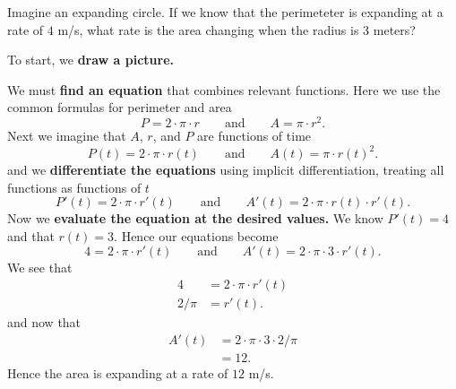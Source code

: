 \documentclass{ximera}
\begin{document}
\begin{example}
  Imagine an expanding circle. If we know that the perimeteter is
  expanding at a rate of $4$ m/s, what rate is the area changing
  when the radius is $3$ meters?
  \begin{explanation}
    To start, we \textbf{draw a picture.}
    \begin{image}
    \end{image}
    We must \textbf{find an equation} that combines relevant
    functions. Here we use the common formulas for perimeter and area
    \[
    P = 2\cdot \pi \cdot r
    \qquad\text{and}\qquad
    A = \pi \cdot r^2.
    \]
    Next we imagine that $A$, $r$, and $P$ are functions of time
    \[
    P(t) = 2\cdot \pi \cdot r(t)
    \qquad\text{and}\qquad
    A(t) = \pi \cdot r(t)^2.
    \]
    and we \textbf{differentiate the equations} using implicit
    differentiation, treating all functions as functions of $t$
    \[
    P'(t) = 2\cdot \pi\cdot r'(t)
    \qquad\text{and}\qquad
    A'(t) = 2\cdot \pi\cdot r(t) \cdot r'(t).
    \]
    Now we \textbf{evaluate the equation at the desired values.} We
    know $P'(t) = 4$ and that $r(t) = 3$. Hence our equations become
    \[
    4 = 2\cdot \pi\cdot r'(t)
    \qquad\text{and}\qquad
    A'(t) = 2\cdot \pi\cdot 3 \cdot r'(t).
    \]
    We see that
    \begin{align*}
      4 &= 2\cdot \pi\cdot r'(t)\\
      2/\pi &= r'(t).
    \end{align*}
    and now that
    \begin{align*}
      A'(t) &= 2\cdot \pi\cdot 3 \cdot 2/\pi\\
      &=12.
    \end{align*}
    Hence the area is expanding at a rate of $12$ m/s.
  \end{explanation}
\end{example}


\end{document}
